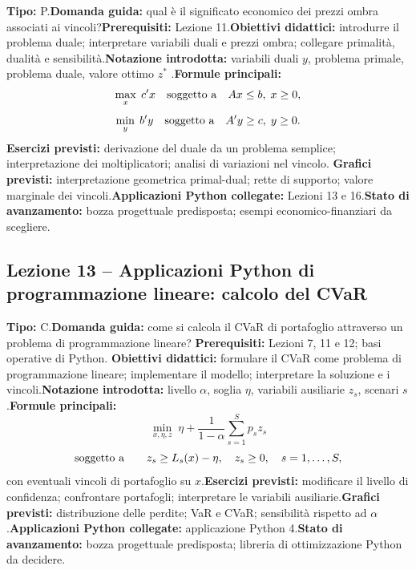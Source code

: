 \documentclass[12pt,a4paper]{article}%
\begin{document}
\textbf{Tipo:} P.\newline\textbf{Domanda guida:} qual \`{e} il significato
economico dei prezzi ombra associati ai vincoli?\newline\textbf{Prerequisiti:}
Lezione 11.\newline\textbf{Obiettivi didattici:} introdurre il problema duale;
interpretare variabili duali e prezzi ombra; collegare primalit\`{a},
dualit\`{a} e sensibilit\`{a}.\newline\textbf{Notazione introdotta:} variabili
duali $y$, problema primale, problema duale, valore ottimo $z^{*}$%
.\newline\textbf{Formule principali:}
\[
\max_{x} \; c^{\prime}x \quad\hbox{soggetto a} \quad Ax\leq b,\; x\geq0,
\]
\[
\min_{y} \; b^{\prime}y \quad\hbox{soggetto a} \quad A^{\prime}y\geq c,\;
y\geq0.
\]
\textbf{Esercizi previsti:} derivazione del duale da un problema semplice;
interpretazione dei moltiplicatori; analisi di variazioni nel vincolo.\newline%
\textbf{Grafici previsti:} interpretazione geometrica primal-dual; rette di
supporto; valore marginale dei vincoli.\newline\textbf{Applicazioni Python
collegate:} Lezioni 13 e 16.\newline\textbf{Stato di avanzamento:} bozza
progettuale predisposta; esempi economico-finanziari da scegliere.

\subsection{Lezione 13 -- Applicazioni Python di programmazione lineare:
calcolo del CVaR}

\textbf{Tipo:} C.\newline\textbf{Domanda guida:} come si calcola il CVaR di
portafoglio attraverso un problema di programmazione lineare?\newline%
\textbf{Prerequisiti:} Lezioni 7, 11 e 12; basi operative di Python.\newline%
\textbf{Obiettivi didattici:} formulare il CVaR come problema di
programmazione lineare; implementare il modello; interpretare la soluzione e i
vincoli.\newline\textbf{Notazione introdotta:} livello $\alpha$, soglia $\eta
$, variabili ausiliarie $z_{s}$, scenari $s$.\newline\textbf{Formule
principali:}
\[
\min_{x,\eta,z} \; \eta+\frac{1}{1-\alpha}\sum_{s=1}^{S}p_{s} z_{s}
\]
\[
\hbox{soggetto a} \qquad z_{s}\geq L_{s}(x)-\eta, \quad z_{s}\geq0, \quad
s=1,\ldots,S,
\]
con eventuali vincoli di portafoglio su $x$.\newline\textbf{Esercizi
previsti:} modificare il livello di confidenza; confrontare portafogli;
interpretare le variabili ausiliarie.\newline\textbf{Grafici previsti:}
distribuzione delle perdite; VaR e CVaR; sensibilit\`{a} rispetto ad $\alpha
$.\newline\textbf{Applicazioni Python collegate:} applicazione Python
4.\newline\textbf{Stato di avanzamento:} bozza progettuale predisposta;
libreria di ottimizzazione Python da decidere.
\end{document}
